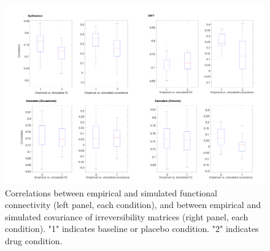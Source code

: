 \begin{figure}[h!]
    \centering
    \includegraphics[width=\textwidth]{images/Appendix_ Fits.png}
    \caption[Whole-brain model fit.]{Correlations between empirical and simulated functional connectivity (left panel, each condition), and between empirical and simulated covariance of irreversibility matrices (right panel, each condition). "1" indicates baseline or placebo condition. "2" indicates drug condition.}
    \label{fig:fits}
\end{figure}

